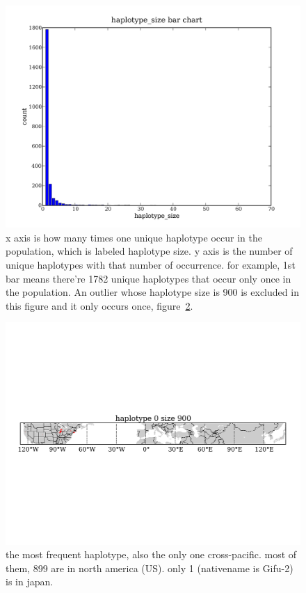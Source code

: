 \documentclass[a4paper,10pt]{article}
\begin{document}

\begin{figure}
\includegraphics[width=1\textwidth]{figures/data_d110_c0_5_haplotype_size_bar_no_900.png}
\caption{x axis is how many times one unique haplotype occur in the population, which is labeled haplotype size. y axis is the number of unique haplotypes with that number of occurrence. for example, 1st bar means there're 1782 unique haplotypes that occur only once in the population. An outlier whose haplotype size is 900 is excluded in this figure and it only occurs once, figure~\ref{fhap_2}.}\label{fhap_1}
\end{figure}

\begin{figure}
\includegraphics[angle=-90,width=1\textwidth]{figures/haplotype_0_size900_map_site_network.png}
\caption{the most frequent haplotype, also the only one cross-pacific. most of them, 899 are in north america (US). only 1 (nativename is Gifu-2) is in japan.}\label{fhap_2}
\end{figure}
\end{document}
